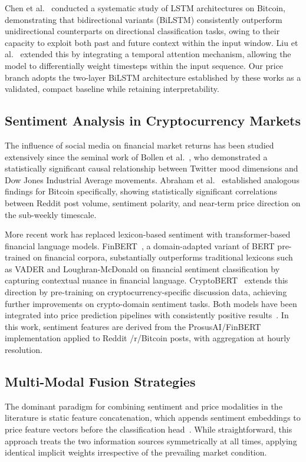 \documentclass[journal]{IEEEtran}
\newcommand{\bilstm}{BiLSTM}
\begin{document}
Chen et al.~\cite{chen2020bitcoin} conducted a systematic study of LSTM
architectures on Bitcoin, demonstrating that bidirectional variants (\bilstm{})
consistently outperform unidirectional counterparts on directional classification
tasks, owing to their capacity to exploit both past and future context within
the input window. Liu et al.~\cite{liu2020predicting} extended this by
integrating a temporal attention mechanism, allowing the model to differentially
weight timesteps within the input sequence. Our price branch adopts the
two-layer \bilstm{} architecture established by these works as a validated,
compact baseline while retaining interpretability.

\subsection{Sentiment Analysis in Cryptocurrency Markets}
The influence of social media on financial market returns has been studied
extensively since the seminal work of Bollen et al.~\cite{bollen2011twitter},
who demonstrated a statistically significant causal relationship between
Twitter mood dimensions and Dow Jones Industrial Average movements.
Abraham et al.~\cite{Abraham2018} established analogous findings for Bitcoin
specifically, showing statistically significant correlations between Reddit
post volume, sentiment polarity, and near-term price direction on the
sub-weekly timescale.

More recent work has replaced lexicon-based sentiment with transformer-based
financial language models. FinBERT~\cite{liu2021finbert}, a domain-adapted
variant of BERT pre-trained on financial corpora, substantially outperforms
traditional lexicons such as VADER and Loughran-McDonald on financial sentiment
classification by capturing contextual nuance in financial language.
CryptoBERT~\cite{huang2023cryptobert} extends this direction by pre-training on
cryptocurrency-specific discussion data, achieving further improvements on
crypto-domain sentiment tasks. Both models have been integrated into
price prediction pipelines with consistently positive
results~\cite{he2023multi, li2023predicting}. In this work, sentiment features
are derived from the ProsusAI/FinBERT implementation applied to Reddit /r/Bitcoin
posts, with aggregation at hourly resolution.

\subsection{Multi-Modal Fusion Strategies}
The dominant paradigm for combining sentiment and price modalities in the
literature is static feature concatenation, which appends sentiment embeddings
to price feature vectors before the classification head~\cite{jiang2021applications,
he2023multi}. While straightforward, this approach treats the two information
sources symmetrically at all times, applying identical implicit weights
irrespective of the prevailing market condition.
\end{document}
